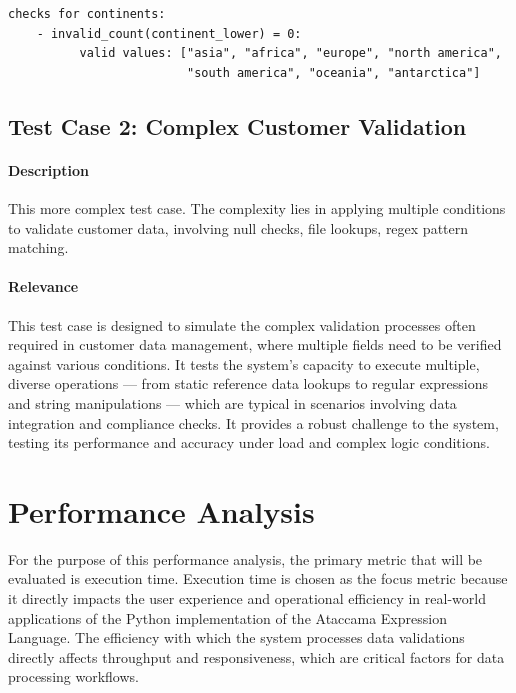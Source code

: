 \begin{verbatim}
checks for continents:
    - invalid_count(continent_lower) = 0:
          valid values: ["asia", "africa", "europe", "north america", 
                         "south america", "oceania", "antarctica"]
\end{verbatim}


\subsection{Test Case 2: Complex Customer Validation}

\paragraph{Description} This more complex test case. The complexity lies in applying multiple conditions to validate customer data, involving null checks, file lookups, regex pattern matching.

\paragraph{Relevance} This test case is designed to simulate the complex validation processes often required in customer data management, where multiple fields need to be verified against various conditions. It tests the system’s capacity to execute multiple, diverse operations — from static reference data lookups to regular expressions and string manipulations — which are typical in scenarios involving data integration and compliance checks. It provides a robust challenge to the system, testing its performance and accuracy under load and complex logic conditions.


\section{Performance Analysis}


For the purpose of this performance analysis, the primary metric that will be evaluated is execution time. Execution time is chosen as the focus metric because it directly impacts the user experience and operational efficiency in real-world applications of the Python implementation of the Ataccama Expression Language. The efficiency with which the system processes data validations directly affects throughput and responsiveness, which are critical factors for data processing workflows.


